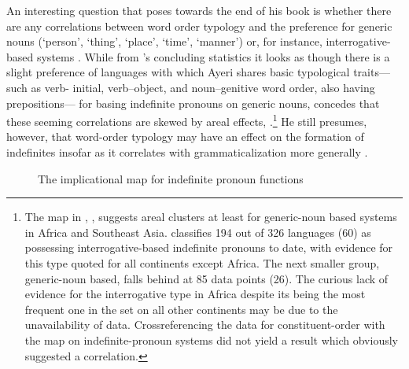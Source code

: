 An interesting question that \citeauthor{haspelmath1997} poses towards the end
of his book is whether there are any correlations between word order typology
and the preference for generic nouns (`person', `thing', `place', `time',
`manner') or, for instance, interrogative-based systems
\citep[239--241]{haspelmath1997}. While from \citeauthor{haspelmath1997}'s
concluding statistics it looks as though there is a slight preference of
languages with which Ayeri shares basic typological traits---such as verb-
initial, verb–object, and noun–genitive word order, also having prepositions---
for basing indefinite pronouns on generic nouns,
\citeauthor{haspelmath1997} concedes that these seeming correlations are skewed
by areal effects, .\footnote{The map in ,
\citet{wals46A}, suggests areal clusters at least for generic-noun based 
systems in Africa and Southeast Asia.  classifies 194 out of 
326 languages (60\pct) as possessing interrogative-based indefinite pronouns 
to date, with evidence for this type quoted for all continents except Africa. 
The next smaller group, generic-noun based, falls behind at 85 data points 
(26\pct). The curious lack of evidence for the interrogative type in Africa 
despite its being the most frequent one in the set on all other continents may 
be due to the unavailability of data. Crossreferencing the  
data for constituent-order with the map on indefinite-pronoun systems did not 
yield a result which obviously suggested a correlation.} He still presumes, 
however, that word-order typology may have an effect on the formation of 
indefinites insofar as it correlates with grammaticalization more generally 
\citep[239]{haspelmath1997}.

\begin{figure}[tp]\centering
\caption[The implicational map for indefinite pronoun functions]{The 
implicational map for indefinite pronoun functions \citep[4]{haspelmath1997}}


\label{fig:haspeltab}
\end{figure}

